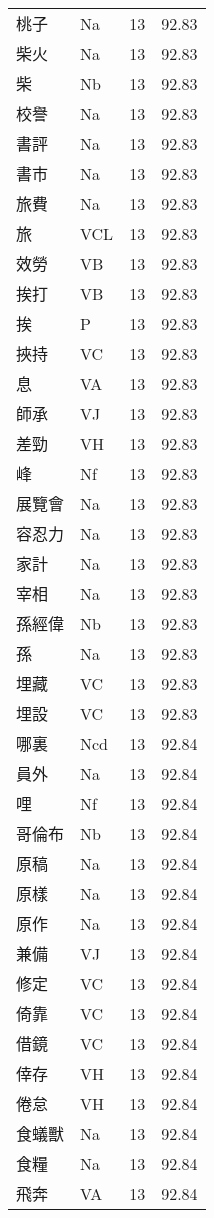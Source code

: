 \documentclass[twocolumn]{book}
\begin{document}
\begin{supertabular}{llrr}
桃子 & Na & 13 &  92.83\\
柴火 & Na & 13 &  92.83\\
柴 & Nb & 13 &  92.83\\
校譽 & Na & 13 &  92.83\\
書評 & Na & 13 &  92.83\\
書市 & Na & 13 &  92.83\\
旅費 & Na & 13 &  92.83\\
旅 & VCL & 13 &  92.83\\
效勞 & VB & 13 &  92.83\\
挨打 & VB & 13 &  92.83\\
挨 & P & 13 &  92.83\\
挾持 & VC & 13 &  92.83\\
息 & VA & 13 &  92.83\\
師承 & VJ & 13 &  92.83\\
差勁 & VH & 13 &  92.83\\
峰 & Nf & 13 &  92.83\\
展覽會 & Na & 13 &  92.83\\
容忍力 & Na & 13 &  92.83\\
家計 & Na & 13 &  92.83\\
宰相 & Na & 13 &  92.83\\
孫經偉 & Nb & 13 &  92.83\\
孫 & Na & 13 &  92.83\\
埋藏 & VC & 13 &  92.83\\
埋設 & VC & 13 &  92.83\\
哪裏 & Ncd & 13 &  92.84\\
員外 & Na & 13 &  92.84\\
哩 & Nf & 13 &  92.84\\
哥倫布 & Nb & 13 &  92.84\\
原稿 & Na & 13 &  92.84\\
原樣 & Na & 13 &  92.84\\
原作 & Na & 13 &  92.84\\
兼備 & VJ & 13 &  92.84\\
修定 & VC & 13 &  92.84\\
倚靠 & VC & 13 &  92.84\\
借鏡 & VC & 13 &  92.84\\
倖存 & VH & 13 &  92.84\\
倦怠 & VH & 13 &  92.84\\
食蟻獸 & Na & 13 &  92.84\\
食糧 & Na & 13 &  92.84\\
飛奔 & VA & 13 &  92.84\\

\end{supertabular}
\end{document}
